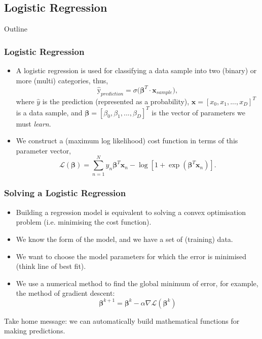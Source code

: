 \documentclass{beamer}
\begin{document}
\subsection{Logistic Regression}


\begin{frame}[noframenumbering]{Outline}
\tableofcontents[currentsubsection]
\end{frame}


\begin{frame}
\frametitle{Logistic Regression}
\begin{itemize}
\item A logistic regression is used for classifying a data sample into two (binary) or more (multi) categories, thus,
$$\hat{\text{y}}_{prediction} = \sigma\big(\boldsymbol\beta^{T} \cdot \boldsymbol{x}_{sample}\big),$$
where $\hat{y}$ is the prediction (represented as a probability), $\boldsymbol{x} = [x_0, x_1, ..., x_D]^T$ is a data sample, and $\boldsymbol\beta = [\beta_0, \beta_1, ..., \beta_D]^T$ is the vector of parameters we must \emph{learn}.
\item We construct a (maximum log likelihood) cost function in terms of this parameter vector,
$$\mathcal{L}(\boldsymbol\beta) = \sum_{n=1}^N y_n\boldsymbol\beta^T\boldsymbol{x}_n - \log[1 + \exp(\boldsymbol\beta^T\boldsymbol{x}_n)].$$
\end{itemize}
\end{frame}


\begin{frame}
\frametitle{Solving a Logistic Regression}\begin{itemize}
\item Building a regression model is equivalent to solving a convex optimisation problem (i.e. minimising the cost function).
\item We know the form of the model, and we have a set of (training) data.
\item We want to choose the model parameters for which the error is minimised (think line of best fit).
\item We use a numerical method to find the global minimum of error, for example, the method of gradient descent:
$$\boldsymbol\beta^{k+1} = \boldsymbol\beta^{k} - \alpha\nabla\mathcal{L}(\boldsymbol\beta^{k})$$
\end{itemize}
Take home message: we can automatically build mathematical functions for making predictions.
\end{frame}
\end{document}
